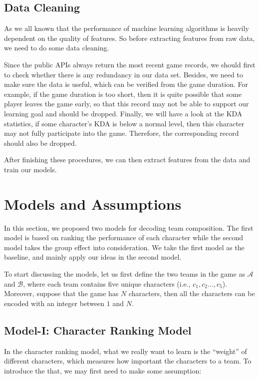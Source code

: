 \documentclass[conference]{IEEEtran}
\begin{document}
\subsection{Data Cleaning}

As we all known that the performance of machine learning algorithms is heavily dependent on the quality of features. So before extracting features from raw data, we need to do some data cleaning.

Since the public APIs always return the most recent game records, we should first to check whether there is any redundancy in our data set. Besides, we need to make sure the data is useful, which can be verified from the game duration. For example, if the game duration is too short, then it is quite possible that some player leaves the game early, so that this record may not be able to support our learning goal and should be dropped. Finally, we will have a look at the KDA statistics, if some character's KDA is below a normal level, then this character may not fully participate into the game. Therefore, the corresponding record should also be dropped.

After finishing these procedures, we can then extract features from the data and train our models.

\section{Models and Assumptions}

In this section, we proposed two models for decoding team composition. The first model is based on ranking the performance of each character while the second model takes the group effect into consideration. We take the first model as the baseline, and mainly apply our ideas in the second model.


To start discussing the models,  let us first define the two teams in the game as $\mathcal{A}$ and $\mathcal{B}$, where each team contains five unique characters (i.e., $c_1,c_2\ldots,c_5$). Moreover, suppose that the game has $N$ characters, then all the characters can be encoded with an integer between $1$ and $N$.

\subsection{Model-I: Character Ranking Model}

In the character ranking model, what we really want to learn is the ``weight'' of different characters, which measures how important the characters to a team. To introduce the that, we may first need to make some assumption:
\end{document}
